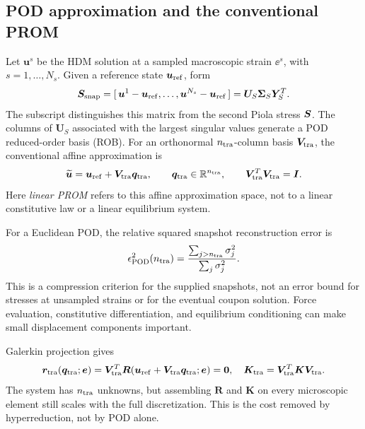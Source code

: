 \subsection{POD approximation and the conventional PROM}
Let $\bm u^s$ be the HDM solution at a sampled macroscopic strain $\ee^s$, with $s=1,\ldots,N_s$. Given a reference state $\bm u_{\rm ref}$, form
\begin{equation}
 \bm S_{\rm snap}=
 [\,\bm u^1-\bm u_{\rm ref},\ldots,\bm u^{N_s}-\bm u_{\rm ref}\,]
 =\bm U_S\bm\Sigma_S\bm Y_S^T.
 \label{eq:snapshot_svd}
\end{equation}
The subscript distinguishes this matrix from the second Piola stress $\bm S$. The columns of $\bm U_S$ associated with the largest singular values generate a POD reduced-order basis (ROB). For an orthonormal $n_{\rm tra}$-column basis $\bm V_{\rm tra}$, the conventional affine approximation is
\begin{equation}
 \widetilde{\bm u}=\bm u_{\rm ref}+\bm V_{\rm tra}\bm q_{\rm tra},
 \qquad \bm q_{\rm tra}\in\mathbb R^{n_{\rm tra}},
 \qquad \bm V_{\rm tra}^T\bm V_{\rm tra}=\bm I.
 \label{eq:linear_prom}
\end{equation}
Here \emph{linear PROM} refers to this affine approximation space, not to a linear constitutive law or a linear equilibrium system.

For a Euclidean POD, the relative squared snapshot reconstruction error is
\begin{equation}
 \epsilon_{\rm POD}^2(n_{\rm tra})=
 \frac{\sum_{j>n_{\rm tra}}\sigma_j^2}{\sum_j\sigma_j^2}.
 \label{eq:pod_tail}
\end{equation}
This is a compression criterion for the supplied snapshots, not an error bound for stresses at unsampled strains or for the eventual coupon solution. Force evaluation, constitutive differentiation, and equilibrium conditioning can make small displacement components important.

Galerkin projection gives
\begin{equation}
 \bm r_{\rm tra}(\bm q_{\rm tra};\bm e)
 =\bm V_{\rm tra}^T
  \bm R(\bm u_{\rm ref}+\bm V_{\rm tra}\bm q_{\rm tra};\bm e)=\bm0,
 \quad
 \bm K_{\rm tra}=\bm V_{\rm tra}^T\bm K\bm V_{\rm tra}.
 \label{eq:linear_galerkin}
\end{equation}
The system has $n_{\rm tra}$ unknowns, but assembling $\bm R$ and $\bm K$ on every microscopic element still scales with the full discretization. This is the cost removed by hyperreduction, not by POD alone.

